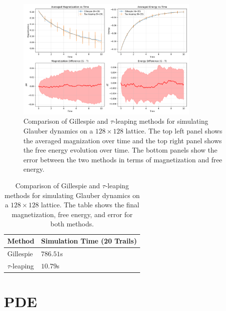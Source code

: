 \documentclass[11pt,a4paper]{article}
\begin{document}
\begin{figure}
    \centering
    \includegraphics[width=0.8\textwidth]{fig/ising_L128_ell8.0_sigma1.0_tau1.0_m00.2_beta1.0_eps0.02_compare_N20.png}
    \caption{Comparison of Gillespie and $\tau$-leaping methods for simulating Glauber dynamics on a $128 \times 128$ lattice. The top left panel shows the averaged magnization over time and the top right panel shows the free energy evolution over time. The bottom panels show the error between the two methods in terms of magnetization and free energy.}
    \label{fig:gillespie_vs_tau_leaping}
\end{figure}

\begin{table}
    \centering
    \begin{tabular}{ll}
        \hline
        \hline
        Method & Simulation Time (20 Trails) \\
        \hline
        Gillespie & $786.51$s \\
        $\tau$-leaping & $10.79$s \\
        \hline
        \hline
    \end{tabular}
    \caption{Comparison of Gillespie and $\tau$-leaping methods for simulating Glauber dynamics on a $128 \times 128$ lattice. The table shows the final magnetization, free energy, and error for both methods.}
    \label{tab:gillespie_vs_tau_leaping}
\end{table}

\section{PDE}
\end{document}
